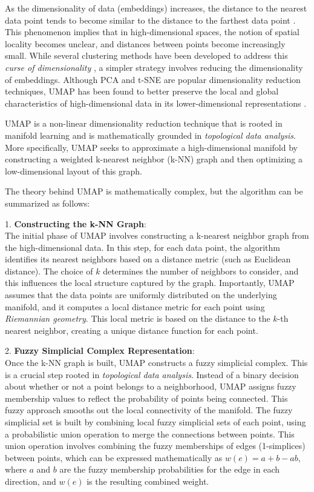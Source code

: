 As the dimensionality of data (embeddings) increases, the distance to the nearest data point tends to become similar to the distance to the farthest data point \cite{aggarwal_surprising_2001, beyer_when_1999}. This phenomenon implies that in high-dimensional spaces, the notion of spatial locality becomes unclear, and distances between points become increasingly small. While several clustering methods have been developed to address this \textit{curse of dimensionality} \cite{pandove_systematic_2018, steinbach_challenges_2004}, a simpler strategy involves reducing the dimensionality of embeddings. Although PCA \cite{abdi_principal_2010} and t-SNE \cite{van_der_maaten_visualizing_2008} are popular dimensionality reduction techniques, UMAP has been found to better preserve the local and global characteristics of high-dimensional data in its lower-dimensional representations \cite{mcinnes_umap_2020}.

UMAP is a non-linear dimensionality reduction technique that is rooted in manifold learning and is mathematically grounded in \textit{topological data analysis}. More specifically, UMAP seeks to approximate a high-dimensional manifold by constructing a weighted k-nearest neighbor (k-NN) graph and then optimizing a low-dimensional layout of this graph.

The theory behind UMAP is mathematically complex, but the algorithm can be summarized as follows:

1. \textbf{Constructing the k-NN Graph}:\\
The initial phase of UMAP involves constructing a k-nearest neighbor graph from the high-dimensional data. In this step, for each data point, the algorithm identifies its nearest neighbors based on a distance metric (such as Euclidean distance). The choice of $k$ determines the number of neighbors to consider, and this influences the local structure captured by the graph. Importantly, UMAP assumes that the data points are uniformly distributed on the underlying manifold, and it computes a local distance metric for each point using \textit{Riemannian geometry}. This local metric is based on the distance to the $k$-th nearest neighbor, creating a unique distance function for each point.

2. \textbf{Fuzzy Simplicial Complex Representation}:\\
Once the k-NN graph is built, UMAP constructs a fuzzy simplicial complex. This is a crucial step rooted in \textit{topological data analysis}. Instead of a binary decision about whether or not a point belongs to a neighborhood, UMAP assigns fuzzy membership values to reflect the probability of points being connected. This fuzzy approach smooths out the local connectivity of the manifold. The fuzzy simplicial set is built by combining local fuzzy simplicial sets of each point, using a probabilistic union operation to merge the connections between points. This union operation involves combining the fuzzy memberships of edges (1-simplices) between points, which can be expressed mathematically as $w(e) = a + b - ab$, where $a$ and $b$ are the fuzzy membership probabilities for the edge in each direction, and $w(e)$ is the resulting combined weight.

